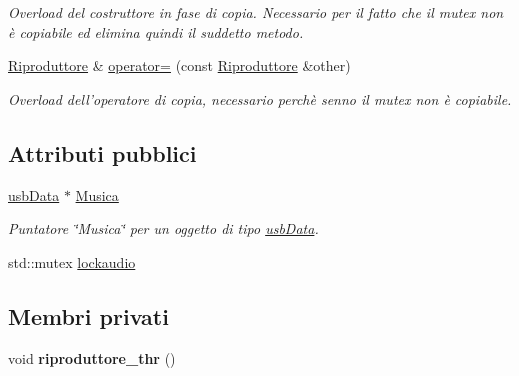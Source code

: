 \begin{DoxyCompactItemize}
\begin{DoxyCompactList}\small\item\em \-Overload del costruttore in fase di copia. \-Necessario per il fatto che il mutex non è copiabile ed elimina quindi il suddetto metodo. \end{DoxyCompactList}\item 
\hypertarget{classRiproduttore_aa3a459e664eb06e359d11e5fd05118f7}{\hyperlink{classRiproduttore}{\-Riproduttore} \& \hyperlink{classRiproduttore_aa3a459e664eb06e359d11e5fd05118f7}{operator=} (const \hyperlink{classRiproduttore}{\-Riproduttore} \&other)}\label{classRiproduttore_aa3a459e664eb06e359d11e5fd05118f7}

\begin{DoxyCompactList}\small\item\em \-Overload dell'operatore di copia, necessario perchè senno il mutex non è copiabile. \end{DoxyCompactList}\end{DoxyCompactItemize}
\subsection*{\-Attributi pubblici}
\begin{DoxyCompactItemize}
\item 
\hyperlink{classusbData}{usb\-Data} $\ast$ \hyperlink{classRiproduttore_a373b2d6675abc22dbe61abf2223cacab}{\-Musica}
\begin{DoxyCompactList}\small\item\em \-Puntatore \char`\"{}\-Musica\char`\"{} per un oggetto di tipo \hyperlink{classusbData}{usb\-Data}. \end{DoxyCompactList}\item 
std\-::mutex \hyperlink{classRiproduttore_a514d48c11b89c737c8e266e1ca3415f1}{lockaudio}
\end{DoxyCompactItemize}
\subsection*{\-Membri privati}
\begin{DoxyCompactItemize}
\item 
\hypertarget{classRiproduttore_ae0c66114fda15b67f39e641bc2318ba7}{void {\bfseries riproduttore\-\_\-thr} ()}\label{classRiproduttore_ae0c66114fda15b67f39e641bc2318ba7}

\end{DoxyCompactItemize}
